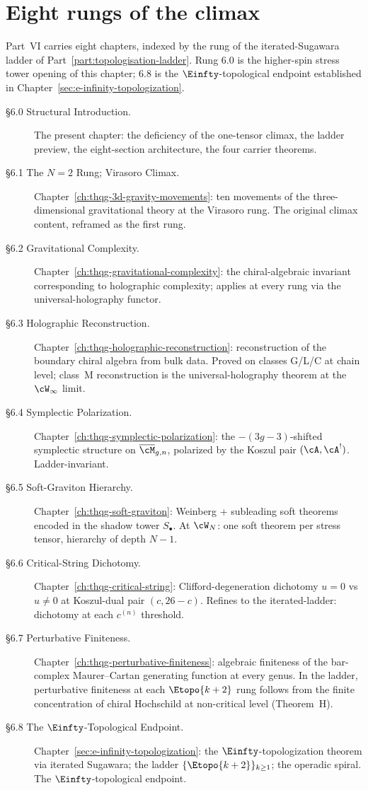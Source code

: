 \section{Eight rungs of the climax}
\label{sec:part-vi-eight-sections}

Part~VI carries eight chapters, indexed by the rung of the
iterated-Sugawara ladder of Part~\ref{part:topologisation-ladder}.
Rung $6.0$ is the higher-spin stress tower opening of this chapter;
$6.8$ is the $\Einfty$-topological endpoint established in
Chapter~\ref{sec:e-infinity-topologization}.

\begin{description}
 \item[\S6.0 Structural Introduction.] The present chapter: the
 deficiency of the one-tensor climax, the ladder preview, the
 eight-section architecture, the four carrier theorems.
 \item[\S6.1 The $N=2$ Rung; Virasoro Climax.]
 \label{sec:part-vi-6-1}
 Chapter~\ref{ch:thqg-3d-gravity-movements}: ten movements of the
 three-dimensional gravitational theory at the Virasoro rung. The
 original climax content, reframed as the first rung.
 \item[\S6.2 Gravitational Complexity.]
 Chapter~\ref{ch:thqg-gravitational-complexity}: the chiral-algebraic
 invariant corresponding to holographic complexity; applies at every
 rung via the universal-holography functor.
 \item[\S6.3 Holographic Reconstruction.]
 Chapter~\ref{ch:thqg-holographic-reconstruction}: reconstruction of the
 boundary chiral algebra from bulk data. Proved on classes G/L/C at
 chain level; class~M reconstruction is the universal-holography theorem
 at the $\cW_\infty$ limit.
 \item[\S6.4 Symplectic Polarization.]
 Chapter~\ref{ch:thqg-symplectic-polarization}: the $-(3g-3)$-shifted
 symplectic structure on $\overline{\cM}_{g,n}$, polarized by the
 Koszul pair $(\cA, \cA^!)$. Ladder-invariant.
 \item[\S6.5 Soft-Graviton Hierarchy.]
 Chapter~\ref{ch:thqg-soft-graviton}: Weinberg + subleading soft
 theorems encoded in the shadow tower $S_\bullet$. At $\cW_N$:
 one soft theorem per stress tensor, hierarchy of depth $N-1$.
 \item[\S6.6 Critical-String Dichotomy.]
 Chapter~\ref{ch:thqg-critical-string}: Clifford-degeneration
 dichotomy $u=0$ vs $u \ne 0$ at Koszul-dual pair $(c, 26-c)$.
 Refines to the iterated-ladder: dichotomy at each $c^{(n)}$ threshold.
 \item[\S6.7 Perturbative Finiteness.]
 Chapter~\ref{ch:thqg-perturbative-finiteness}: algebraic finiteness of the
 bar-complex Maurer--Cartan generating function at every genus. In the
 ladder, perturbative finiteness at each $\Etopo{k+2}$ rung follows from
 the finite concentration of chiral Hochschild at non-critical level
 (Theorem~H).
 \item[\S6.8 The $\Einfty$-Topological Endpoint.]
 \label{sec:part-vi-6-8}
 Chapter~\ref{sec:e-infinity-topologization}: the $\Einfty$-topologization
 theorem via iterated Sugawara; the ladder $\{\Etopo{k+2}\}_{k \ge 1}$;
 the operadic spiral. The $\Einfty$-topological endpoint.
\end{description}

